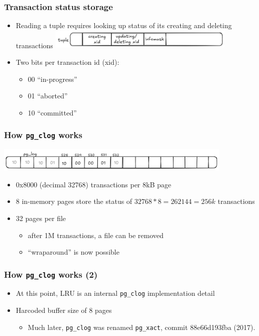 \begin{frame}
  \frametitle{Transaction status storage}
  \begin{itemize}
    \item Reading a tuple requires looking up status of its creating
	    and deleting transactions
  \includegraphics[width=0.7\textwidth]{tuple0.png}

\item Two bits per transaction id (xid):
      \begin{itemize}
	\item 00 \textrightarrow{} ``in-progress''
	\item 01 \textrightarrow{} ``aborted''
	\item 10 \textrightarrow{} ``committed''
      \end{itemize}
  \end{itemize}

\end{frame}

\begin{frame}
  \frametitle{How \texttt{pg\_clog} works}
  \includegraphics[width=0.85\textwidth]{pg_log.png}
  \begin{itemize}
    \item 0x8000 (decimal 32768) transactions per 8kB page
    \item 8 in-memory pages store the status of $ 32768 * 8 = 262144 = 256k $ transactions
    \item 32 pages per file
      \begin{itemize}
	\item after 1M transactions, a file can be removed
	\item ``wraparound'' is now possible
      \end{itemize}
  \end{itemize}
\end{frame}

\begin{frame}
  \frametitle{How \texttt{pg\_clog} works (2)}
  \begin{itemize}
    \item At this point, LRU is an internal \texttt{pg\_clog} implementation detail
    \item Harcoded buffer size of 8 pages
      \begin{itemize}
	\item Much later, \texttt{pg\_clog} was renamed \texttt{pg\_xact}, 
	  commit 88e66d193fba (2017).
      \end{itemize}
  \end{itemize}
\end{frame}

